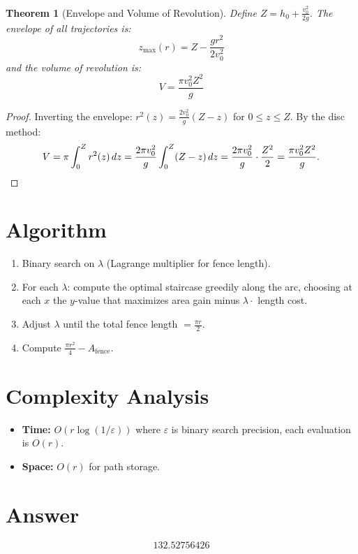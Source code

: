 \documentclass[12pt]{article}
\newtheorem{theorem}{Theorem}
\begin{document}
\begin{theorem}[Envelope and Volume of Revolution]
Define $Z = h_0 + \frac{v_0^2}{2g}$. The envelope of all trajectories is:
\[
    z_{\max}(r) = Z - \frac{gr^2}{2v_0^2}
\]
and the volume of revolution is:
\[
    V = \frac{\pi v_0^2 Z^2}{g}
\]
\end{theorem}

\begin{proof}
Inverting the envelope: $r^2(z) = \frac{2v_0^2}{g}(Z - z)$ for $0 \le z \le Z$. By the disc method:
\[
    V = \pi \int_0^{Z} r^2(z)\,dz = \frac{2\pi v_0^2}{g}\int_0^{Z}(Z-z)\,dz = \frac{2\pi v_0^2}{g} \cdot \frac{Z^2}{2} = \frac{\pi v_0^2 Z^2}{g}. \qedhere
\]
\end{proof}

\section{Algorithm}

\begin{enumerate}
    \item Binary search on $\lambda$ (Lagrange multiplier for fence length).
    \item For each $\lambda$: compute the optimal staircase greedily along the arc, choosing at each $x$ the $y$-value that maximizes area gain minus $\lambda \cdot$ length cost.
    \item Adjust $\lambda$ until the total fence length $= \frac{\pi r}{2}$.
    \item Compute $\frac{\pi r^2}{4} - A_{\text{fence}}$.
\end{enumerate}

\section{Complexity Analysis}

\begin{itemize}
    \item \textbf{Time:} $O(r \log(1/\varepsilon))$ where $\varepsilon$ is binary search precision, each evaluation is $O(r)$.
    \item \textbf{Space:} $O(r)$ for path storage.
\end{itemize}

\section{Answer}

\[
\boxed{132.52756426}
\]
\end{document}
